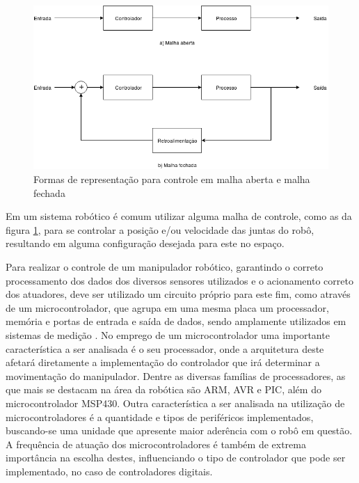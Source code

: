\begin{figure}[h]
\caption{Formas de representação para controle em malha aberta e malha fechada}    
\begin{centering}
\includegraphics[width=0.85\columnwidth]{images/fundamentos/excontrole.png}
\par\end{centering}

\label{fig:excontrole}
\end{figure}

Em um sistema robótico é comum utilizar alguma malha de controle, como as da figura \ref{fig:excontrole}, para se controlar a posição e/ou velocidade
das juntas do robô, resultando em alguma configuração desejada para este no espaço. 

\newpage

Para realizar o controle de um manipulador robótico, garantindo
o correto processamento dos dados dos diversos sensores utilizados e o 
acionamento correto dos atuadores, deve ser utilizado um circuito próprio para este fim, como através de um microcontrolador, que 
agrupa em uma mesma placa um processador, memória e portas de entrada e saída de dados, sendo amplamente utilizados em sistemas de medição \cite{bentley2005principles}.
No emprego de um microcontrolador uma importante característica a ser analisada é o seu processador, onde a arquitetura deste afetará
diretamente a implementação do controlador que irá determinar a movimentação do manipulador. Dentre as diversas famílias de processadores, as que mais se 
destacam na área da robótica são ARM, AVR e PIC, além do microcontrolador MSP430. Outra característica a ser analisada na utilização de microcontroladores é 
a quantidade e tipos de periféricos implementados, buscando-se uma unidade que apresente maior aderência com o robô em questão. A frequência de atuação dos
microcontroladores é também de extrema importância na escolha destes, influenciando o tipo de controlador que pode ser implementado, no caso de controladores
digitais.

